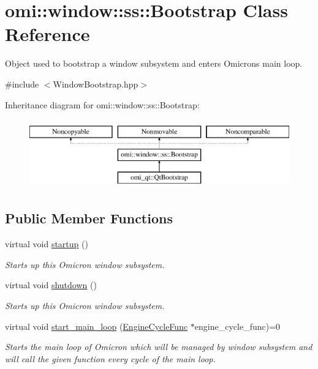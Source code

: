 \hypertarget{classomi_1_1window_1_1ss_1_1_bootstrap}{}\section{omi\+:\+:window\+:\+:ss\+:\+:Bootstrap Class Reference}
\label{classomi_1_1window_1_1ss_1_1_bootstrap}


Object used to bootstrap a window subsystem and enters Omicron\textquotesingle{}s main loop.  




{\ttfamily \#include $<$Window\+Bootstrap.\+hpp$>$}

Inheritance diagram for omi\+:\+:window\+:\+:ss\+:\+:Bootstrap\+:\begin{figure}[H]
\begin{center}
\leavevmode
\includegraphics[height=3.000000cm]{classomi_1_1window_1_1ss_1_1_bootstrap}
\end{center}
\end{figure}
\subsection*{Public Member Functions}
\begin{DoxyCompactItemize}
\item 
virtual void \hyperlink{classomi_1_1window_1_1ss_1_1_bootstrap_a69b71f75e8be1496de09b3c5c647ded2}{startup} ()
\begin{DoxyCompactList}\small\item\em Starts up this Omicron window subsystem. \end{DoxyCompactList}\item 
virtual void \hyperlink{classomi_1_1window_1_1ss_1_1_bootstrap_a6e1b4cae0710d47c28de0cda82ef9378}{shutdown} ()
\begin{DoxyCompactList}\small\item\em Starts up this Omicron window subsystem. \end{DoxyCompactList}\item 
virtual void \hyperlink{classomi_1_1window_1_1ss_1_1_bootstrap_a412da1412bbf4e0c4eae29b04469a4e2}{start\+\_\+main\+\_\+loop} (\hyperlink{namespaceomi_1_1window_1_1ss_af42d2464a170bdfd876a35b9fde16137}{Engine\+Cycle\+Func} $\ast$engine\+\_\+cycle\+\_\+func)=0\hypertarget{classomi_1_1window_1_1ss_1_1_bootstrap_a412da1412bbf4e0c4eae29b04469a4e2}{}\label{classomi_1_1window_1_1ss_1_1_bootstrap_a412da1412bbf4e0c4eae29b04469a4e2}

\begin{DoxyCompactList}\small\item\em Starts the main loop of Omicron which will be managed by window subsystem and will call the given function every cycle of the main loop. \end{DoxyCompactList}\end{DoxyCompactItemize}
